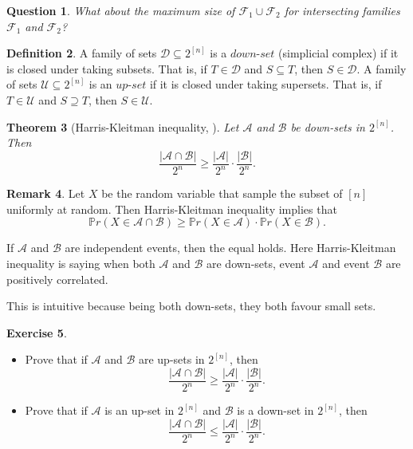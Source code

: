 \documentclass{article}
\newtheorem{theorem}{Theorem}[section]
\newtheorem{question}[theorem]{Question}
\theoremstyle{definition}
\newtheorem{remark}[theorem]{Remark}
\newtheorem{definition}[theorem]{Definition}
\newtheorem{exercise}[theorem]{Exercise}
\begin{document}
\begin{question}
    What about the maximum size of $\mathcal{F}_1 \cup \mathcal{F}_2$ for intersecting families $\mathcal{F}_1$ and $\mathcal{F}_2$?
\end{question}

\begin{definition}
    A family of sets $\mathcal{D} \subseteq 2^{[n]}$ is a $down$-$set$ (simplicial complex) if it is closed under taking subsets. That is, if $T\in \mathcal{D}$ and $S\subseteq T$, then $S \in \mathcal{D}$.
    A family of sets $\mathcal{U} \subseteq 2^{[n]}$ is an $up$-$set$ if it is closed under taking supersets. That is, if $T\in \mathcal{U}$ and $S\supseteq T$, then $S \in \mathcal{U}$.
\end{definition}

\begin{theorem}[Harris-Kleitman inequality, \cite{KLEITMAN1966153}]{} \label{HK}
    Let $\mathcal{A}$ and $\mathcal{B}$ be down-sets in $2^{[n]}$. Then $$\frac{|\mathcal{A} \cap \mathcal{B}|}{2^n} \geq \frac{|\mathcal{A}|}{2^n} \cdot \frac{|\mathcal{B}|}{2^n}.$$
\end{theorem}
\begin{remark}
    Let $X$ be the random variable that sample the subset of $[n]$ uniformly at random. Then Harris-Kleitman inequality implies that $$\mathbb{P}r(X \in \mathcal{A} \cap \mathcal{B}) \geq \mathbb{P}r(X \in \mathcal{A}) \cdot \mathbb{P}r(X \in \mathcal{B}).$$

    If $\mathcal{A}$ and $\mathcal{B}$ are independent events, then the equal holds. Here Harris-Kleitman inequality is saying when both $\mathcal{A}$ and $\mathcal{B}$ are down-sets, event $\mathcal{A}$ and event $\mathcal{B}$ are positively correlated.
\end{remark}
This is intuitive because being both down-sets, they both favour small sets.

\begin{exercise}\label{ex16-2}
    \begin{itemize}
        \item Prove that if $\mathcal{A}$ and $\mathcal{B}$ are up-sets in $2^{[n]}$, then $$\frac{|\mathcal{A} \cap \mathcal{B}|}{2^n} \geq \frac{|\mathcal{A}|}{2^n} \cdot \frac{|\mathcal{B}|}{2^n}.$$

        \item Prove that if $\mathcal{A}$ is an up-set in $2^{[n]}$ and $\mathcal{B}$ is a down-set in $2^{[n]}$, then $$\frac{|\mathcal{A} \cap \mathcal{B}|}{2^n} \leq \frac{|\mathcal{A}|}{2^n} \cdot \frac{|\mathcal{B}|}{2^n}.$$
    \end{itemize}
\end{exercise}
\end{document}

